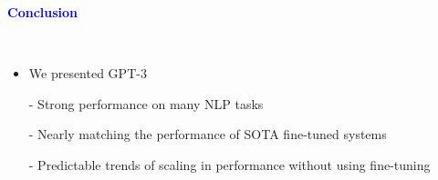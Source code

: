 \documentclass[professionalfont]{beamer}
\begin{document}
\begin{frame}

\begin{center}
    { \textbf{\textcolor{blue}{ {\fontsize{12}{14}\selectfont Conclusion} }} }
\end{center}
\\[0.2cm]

{\fontsize{10}{14}\selectfont 
\begin{itemize}
    \item We presented GPT-3

    - Strong performance on many NLP tasks

    - Nearly matching the performance of SOTA fine-tuned systems

    - Predictable trends of scaling in performance without using fine-tuning
    
\end{itemize}
}

\end{frame}
\end{document}
